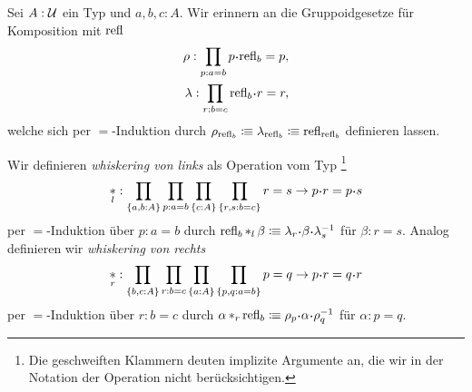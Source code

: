 \documentclass{uebung}
\DeclareMathOperator*{\whisk}{\ast}
\begin{document}
\begin{exercise}
  Sei $A:\mathcal{U}$ ein Typ und $a,b,c:A$.
  Wir erinnern an die Gruppoidgesetze für Komposition mit $\mathrm{refl}$
  \begin{align*}
    \rho:\prod_{p:a=b}p\kon\refl_b = p,\\
    \lambda:\prod_{r:b=c}\refl_b\kon r= r,
  \end{align*}
  welche sich per $=$-Induktion durch $\rho_{\mathrm{refl}_b} \vcentcolon\mspace{-1.2mu}\equiv \lambda_{\mathrm{refl}_b} \vcentcolon\mspace{-1.2mu}\equiv \mathrm{refl}_{\mathrm{refl}_b}$ definieren lassen.

  Wir definieren \emph{whiskering von links} als Operation vom Typ%
  \footnote{Die geschweiften Klammern deuten implizite Argumente an, die wir in der Notation der Operation nicht berücksichtigen.}
  $$
  \whisk_l:\prod_{\{a,b:A\}}\prod_{p:a=b}\prod_{\{c:A\}}\prod_{\{r,s:b=c\}}r=s\to p\kon r=p\kon s
  $$
  per $=$-Induktion über $p:a=b$ durch $\refl_b\whisk_l\beta \colonequiv\lambda_r\kon\beta\kon\lambda_s^{-1}$ für $\beta:r=s$.
  Analog definieren wir \emph{whiskering von rechts}
  $$
  \whisk_r:\prod_{\{b,c:A\}}\prod_{r:b=c}\prod_{\{a:A\}}\prod_{\{p,q:a=b\}}p=q\to p\kon r=q\kon r
  $$
  per $=$-Induktion über $r:b=c$ durch $\alpha\whisk_r\refl_b \colonequiv \rho_p\kon\alpha\kon\rho_q^{-1}$ für $\alpha:p=q$.


\end{exercise}
\end{document}
